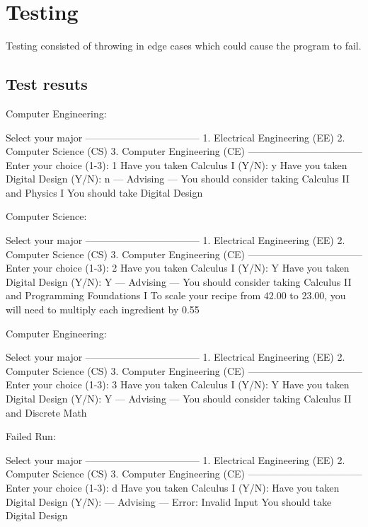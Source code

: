 \documentclass[12pt, letterpaper]{article}
\begin{document}
\section{Testing}
Testing consisted of throwing in edge cases which could cause the program to fail.
\noindent
\begin{center}
    \subsection*{Test resuts}
    Computer Engineering:
\begin{MyVerbatim}
Select your major
-----------------------------------
  1. Electrical Engineering (EE)
  2. Computer Science (CS)
  3. Computer Engineering (CE)
-----------------------------------
Enter your choice (1-3): 1
Have you taken Calculus I (Y/N): y
Have you taken Digital Design (Y/N): n
--- Advising ---
You should consider taking Calculus II and Physics I
You should take Digital Design
\end{MyVerbatim}
\end{center}
\pagebreak
\begin{center}
    Computer Science:
\begin{MyVerbatim}
Select your major
-----------------------------------
  1. Electrical Engineering (EE)
  2. Computer Science (CS)
  3. Computer Engineering (CE)
-----------------------------------
Enter your choice (1-3): 2
Have you taken Calculus I (Y/N): Y
Have you taken Digital Design (Y/N): Y
--- Advising ---
You should consider taking Calculus II and Programming Foundations I
To scale your recipe from 42.00 to 23.00, you will need to multiply each ingredient by 0.55
\end{MyVerbatim}
\end{center}
\begin{center}
    Computer Engineering:
\begin{MyVerbatim}
Select your major
-----------------------------------
  1. Electrical Engineering (EE)
  2. Computer Science (CS)
  3. Computer Engineering (CE)
-----------------------------------
Enter your choice (1-3): 3
Have you taken Calculus I (Y/N): Y
Have you taken Digital Design (Y/N): Y
--- Advising ---
You should consider taking Calculus II and Discrete Math
\end{MyVerbatim}
\end{center}
\begin{center}
    Failed Run:
\begin{MyVerbatim}
Select your major
-----------------------------------
  1. Electrical Engineering (EE)
  2. Computer Science (CS)
  3. Computer Engineering (CE)
-----------------------------------
Enter your choice (1-3): d
Have you taken Calculus I (Y/N): Have you taken Digital Design (Y/N): --- Advising ---
Error: Invalid Input
You should take Digital Design
\end{MyVerbatim}
\end{center}
\end{document}
